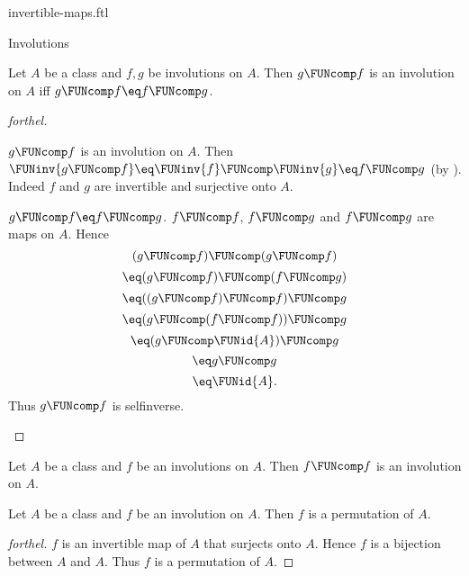 \documentclass{naproche-library}
\begin{document}
\begin{smodule}[title=Invertible Maps]{invertible-maps.ftl}
\begin{sfragment}{Involutions}
  \begin{proposition}[forthel,id=FOUNDATIONS_09_6897019612299264]
    Let $A$ be a class and $f, g$ be involutions on $A$.
    Then $g \FUNcomp f$ is an involution on $A$ iff $g \FUNcomp f \eq f \FUNcomp g$.
  \end{proposition}
  \begin{proof}[forthel]
    \begin{case}{$g \FUNcomp f$ is an involution on $A$.}
      Then $\FUNinv{g \FUNcomp f}
        \eq \FUNinv{f} \FUNcomp \FUNinv{g}
        \eq f \FUNcomp g$
      (by ).
      Indeed $f$ and $g$ are invertible and surjective onto $A$.
    \end{case}

    \begin{case}{$g \FUNcomp f \eq f \FUNcomp g$.}
      $f \FUNcomp f$, $f \FUNcomp g$ and $f \FUNcomp g$ are maps on $A$.
      Hence
      \[  (g \FUNcomp f) \FUNcomp (g \FUNcomp f)       \]
      \[    \eq (g \FUNcomp f) \FUNcomp (f \FUNcomp g)   \]
      \[    \eq ((g \FUNcomp f) \FUNcomp f) \FUNcomp g   \]
      \[    \eq (g \FUNcomp (f \FUNcomp f)) \FUNcomp g   \]
      \[    \eq (g \FUNcomp \FUNid{A}) \FUNcomp g       \]
      \[    \eq g \FUNcomp g                       \]
      \[    \eq \FUNid{A}.                        \]
      Thus $g \FUNcomp f$ is selfinverse.
    \end{case}
  \end{proof}

  \begin{corollary}[forthel,id=FOUNDATIONS_09_5958206868160512]
    Let $A$ be a class and $f$ be an involutions on $A$.
    Then $f \FUNcomp f$ is an involution on $A$.
  \end{corollary}

  \begin{proposition}[forthel,id=FOUNDATIONS_09_2314262743613440]
    Let $A$ be a class and $f$ be an involution on $A$.
    Then $f$ is a permutation of $A$.
  \end{proposition}
  \begin{proof}[forthel]
    $f$ is an invertible map of $A$ that surjects onto $A$.
    Hence $f$ is a bijection between $A$ and $A$.
    Thus $f$ is a permutation of $A$.
  \end{proof}
\end{sfragment}
\end{smodule}
\end{document}
